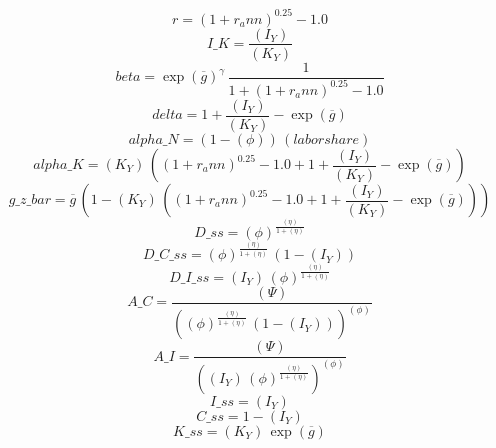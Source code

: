 \begin{dmath*}
r = \left(1+{{r_ann}}\right)^{0.25}-1.0
\end{dmath*}
\begin{dmath*}
I\_K = \frac{{(I_Y)}}{{(K_Y)}}
\end{dmath*}
\begin{dmath*}
beta = \exp\left({{\overline{g}}}\right)^{{{\gamma}}}\, \frac{1}{1+\left(1+{{r_ann}}\right)^{0.25}-1.0}
\end{dmath*}
\begin{dmath*}
delta = 1+\frac{{(I_Y)}}{{(K_Y)}}-\exp\left({{\overline{g}}}\right)
\end{dmath*}
\begin{dmath*}
alpha\_N = \left(1-{(\phi)}\right)\, {(labor share)}
\end{dmath*}
\begin{dmath*}
alpha\_K = {(K_Y)}\, \left(\left(1+{{r_ann}}\right)^{0.25}-1.0+1+\frac{{(I_Y)}}{{(K_Y)}}-\exp\left({{\overline{g}}}\right)\right)
\end{dmath*}
\begin{dmath*}
g\_z\_bar = {{\overline{g}}}\, \left(1-{(K_Y)}\, \left(\left(1+{{r_ann}}\right)^{0.25}-1.0+1+\frac{{(I_Y)}}{{(K_Y)}}-\exp\left({{\overline{g}}}\right)\right)\right)
\end{dmath*}
\begin{dmath*}
D\_ss = {(\phi)}^{\frac{{(\eta)}}{1+{(\eta)}}}
\end{dmath*}
\begin{dmath*}
D\_C\_ss = {(\phi)}^{\frac{{(\eta)}}{1+{(\eta)}}}\, \left(1-{(I_Y)}\right)
\end{dmath*}
\begin{dmath*}
D\_I\_ss = {(I_Y)}\, {(\phi)}^{\frac{{(\eta)}}{1+{(\eta)}}}
\end{dmath*}
\begin{dmath*}
A\_C = \frac{{(\Psi)}}{\left({(\phi)}^{\frac{{(\eta)}}{1+{(\eta)}}}\, \left(1-{(I_Y)}\right)\right)^{{(\phi)}}}
\end{dmath*}
\begin{dmath*}
A\_I = \frac{{(\Psi)}}{\left({(I_Y)}\, {(\phi)}^{\frac{{(\eta)}}{1+{(\eta)}}}\right)^{{(\phi)}}}
\end{dmath*}
\begin{dmath*}
I\_ss = {(I_Y)}
\end{dmath*}
\begin{dmath*}
C\_ss = 1-{(I_Y)}
\end{dmath*}
\begin{dmath*}
K\_ss = {(K_Y)}\, \exp\left({{\overline{g}}}\right)
\end{dmath*}
